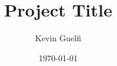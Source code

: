 \documentclass[12pt]{article}
\begin{document}
\title{Project Title}
\author{Kevin Guelfi}
\date{\today}

\maketitle













\end{document}
